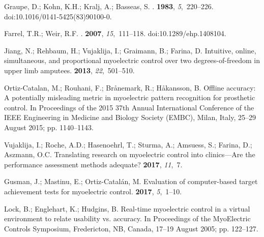 \documentclass[sensors,review,accept,moreauthors,pdftex]{Definitions/mdpi}
\begin{document}
\begin{thebibliography}{999}
Graupe, D.; Kohn, K.H.; Kralj, A.; Basseas, S.
.
 {\bf 1983}, {\em
  5},~220--226. doi:10.1016/0141-5425(83)90100-0.

Farrel, T.R.; Weir, R.F.
.
 {\bf 2007}, {\em 15},~111--118. doi:10.1289/ehp.1408104.

Jiang, N.; Rehbaum, H.; Vujaklija, I.; Graimann, B.; Farina, D.
\newblock Intuitive, online, simultaneous, and proportional myoelectric control
  over two degrees-of-freedom in upper limb amputees.
 {\bf 2013}, {\em 22},~501--510.

Ortiz-Catalan, M.; Rouhani, F.; Br{\aa}nemark, R.; H{\aa}kansson, B.
\newblock Offline accuracy: A potentially misleading metric in myoelectric
  pattern recognition for prosthetic control.
In {Proceedings of the 2015 37th Annual International Conference of the IEEE Engineering in Medicine and Biology Society (EMBC),} Milan, Italy, 25--29 August 2015; pp. 1140--1143.

Vujaklija, I.; Roche, A.D.; Hasenoehrl, T.; Sturma, A.; Amsuess, S.; Farina,
  D.; Aszmann, O.C.
\newblock Translating research on myoelectric control into clinics---Are the
  performance assessment methods adequate?
 {\bf 2017}, {\em 11},~7.

Gusman, J.; Mastinu, E.; Ortiz-Catal{\'a}n, M.
\newblock Evaluation of computer-based target achievement tests for myoelectric
  control.
 {\bf 2017}, {\em 5},~1--10.

Lock, B.; Englehart, K.; Hudgins, B.
\newblock Real-time myoelectric control in a virtual environment to relate
  usability vs. accuracy.
In {Proceedings of the MyoElectric Controls Symposium,} Fredericton, NB, Canada, 17--19 August 2005; pp. 122--127.


\end{thebibliography}
\end{document}
